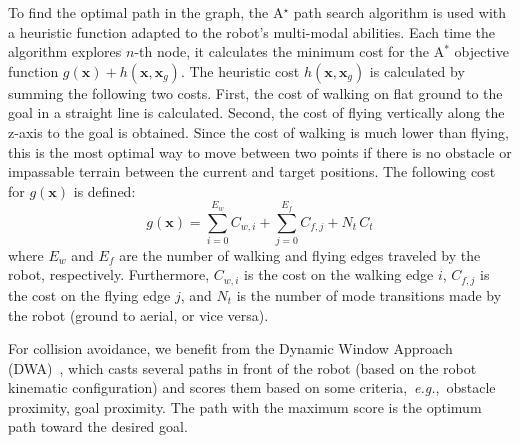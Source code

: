 \documentclass[letterpaper, 10 pt, conference]{ieeeconf}  %
\newcommand{\eg}{\emph{e.g.},}
\newcommand{\filip}[1]{{\color{green}#1}}
\begin{document}
{To find the optimal path in the graph, the A$^\star$ path search algorithm \cite{A_star, dijkstra1959note} is used with a heuristic function adapted to the robot's multi-modal abilities.
Each time the algorithm explores $n$-th node, it calculates the minimum cost for the A$^*$ objective function $g(\mathbf{x}) + h(\mathbf{x},\mathbf{x}_g)$.
The heuristic cost $h(\mathbf{x},\mathbf{x}_g)$ is calculated by summing the following two costs. First, the cost of walking on flat ground to the goal in a straight line is calculated. Second, the cost of flying vertically along the z-axis to the goal is obtained. Since the cost of walking is much lower than flying, this is the most optimal way to move between two points if there is no obstacle or impassable terrain between the current and target positions. The following cost for $g(\mathbf{x})$ is defined:
%
\begin{equation}
    \textstyle
    g(\mathbf{x}) = \sum_{i = 0}^{E_w} C_{w,i} + \sum_{j = 0}^{E_f} C_{f,j} + N_t\, C_{t}
    \label{eq:g(n)}
\end{equation}
%
\noindent where $E_w$ and $E_f$ are the number of walking and flying edges traveled by the robot, respectively. Furthermore, $C_{w,i}$ is the cost on the walking edge $i$, $C_{f,j}$ is the cost on the flying edge $j$, and $N_t$ is the number of mode transitions made by the robot (ground to aerial, or vice versa).
}

For collision avoidance, we benefit from the Dynamic Window Approach (DWA)~\cite{fox1997dynamic}, which casts several paths in front of the robot (based on the robot kinematic configuration) and scores them based on some criteria,~\eg~obstacle proximity, goal proximity. The path with the maximum score is the optimum path toward the desired goal. 
\end{document}
